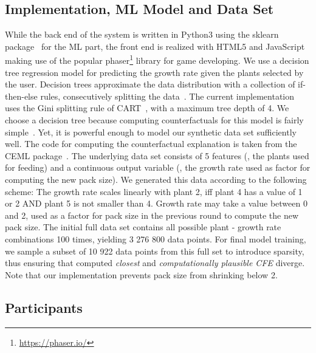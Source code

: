 \subsection{Implementation, ML Model and Data Set}
While the back end of the system is written in Python3 using the sklearn package~\citep{pedregosa_scikit-learn_2011} for the \gls{ML} part, the front end is realized with HTML5 and JavaScript making use of the popular phaser\footnote{\url{https://phaser.io/}} library for game developing.
We use a decision tree regression model for predicting the growth rate given the plants selected by the user. 
Decision trees approximate the data distribution with a collection of if-then-else rules, consecutively splitting the data~\citep{shalev-shwartz_understanding_2014}. 
The current implementation uses the Gini splitting rule of CART~\citep{breiman_classification_1984}, with a maximum tree depth of 4.
We choose a decision tree because computing counterfactuals for this model is fairly simple~\citep{artelt_computation_2019}.
Yet, it is powerful enough to model our synthetic data set sufficiently well.
The code for computing the counterfactual explanation is taken from the CEML package~\citep{artelt_ceml_2019}.
The underlying data set consists of 5 features (\ie, the plants used for feeding) and a continuous output variable (\ie, the growth rate used as factor for computing the new pack size). We generated this data according to the following scheme: The growth rate scales linearly with plant 2, iff plant 4 has a value of 1 or 2 AND plant 5 is not smaller than 4. 
Growth rate may take a value between 0 and 2, used as a factor for pack size in the previous round to compute the new pack size.
The initial full data set contains all possible plant - growth rate combinations 100 times, yielding 3 276 800 data points. 
For final model training, we sample a subset of 10 922 data points from this full set to introduce sparsity, thus ensuring that computed \textit{closest} and \textit{computationally plausible \gls{CFE}} diverge.
Note that our implementation prevents pack size from shrinking below 2.

\subsection{Participants}

